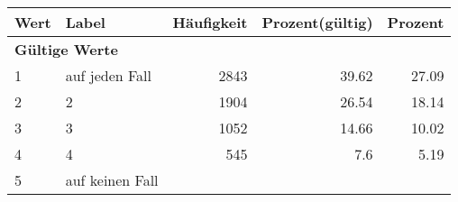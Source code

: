      \begin{longtable}{lXrrr}
     \toprule
     \textbf{Wert} & \textbf{Label} & \textbf{Häufigkeit} & \textbf{Prozent(gültig)} & \textbf{Prozent} \\
     \endhead
     \midrule
     \multicolumn{5}{l}{\textbf{Gültige Werte}}\\

     1 &
     \multicolumn{1}{X}{ auf jeden Fall   } &


       \num{2843} &
       \num[round-mode=places,round-precision=2]{39,62} &
         \num[round-mode=places,round-precision=2]{27,09} \\

     2 &
     \multicolumn{1}{X}{ 2   } &


       \num{1904} &
       \num[round-mode=places,round-precision=2]{26,54} &
         \num[round-mode=places,round-precision=2]{18,14} \\

     3 &
     \multicolumn{1}{X}{ 3   } &


       \num{1052} &
       \num[round-mode=places,round-precision=2]{14,66} &
         \num[round-mode=places,round-precision=2]{10,02} \\

     4 &
     \multicolumn{1}{X}{ 4   } &


       \num{545} &
       \num[round-mode=places,round-precision=2]{7,6} &
         \num[round-mode=places,round-precision=2]{5,19} \\

     5 &
     \multicolumn{1}{X}{ auf keinen Fall   } &



\end{longtable}
